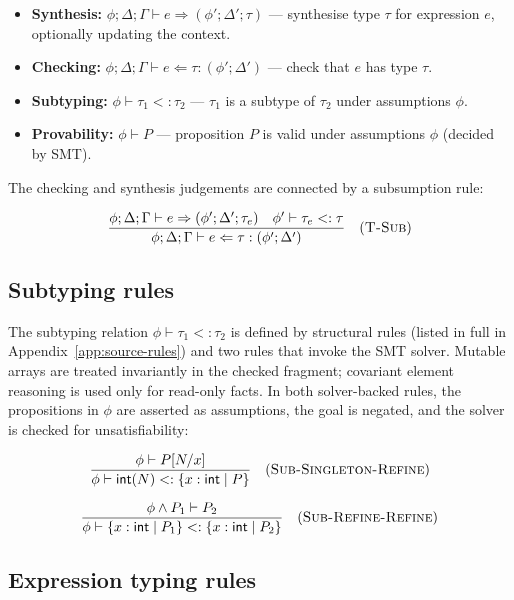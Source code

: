 \begin{itemize}
    \item \textbf{Synthesis:} $\phi; \Delta; \Gamma \vdash e \Rightarrow (\phi'; \Delta'; \tau)$ --- synthesise type $\tau$ for expression $e$, optionally updating the context.
    \item \textbf{Checking:} $\phi; \Delta; \Gamma \vdash e \Leftarrow \tau : (\phi'; \Delta')$ --- check that $e$ has type $\tau$.
    \item \textbf{Subtyping:} $\phi \vdash \tau_1 <: \tau_2$ --- $\tau_1$ is a subtype of $\tau_2$ under assumptions $\phi$.
    \item \textbf{Provability:} $\phi \vdash P$ --- proposition $P$ is valid under assumptions $\phi$ (decided by SMT).
\end{itemize}

The checking and synthesis judgements are connected by a subsumption rule:

$$\frac{\phi; \Delta; \Gamma \vdash e \Rightarrow (\phi'; \Delta'; \tau_e) \quad \phi' \vdash \tau_e <: \tau}{\phi; \Delta; \Gamma \vdash e \Leftarrow \tau : (\phi'; \Delta')} \quad (\textsc{T-Sub})$$

\subsection{Subtyping rules}

The subtyping relation $\phi \vdash \tau_1 <: \tau_2$ is defined by structural rules (listed in full in Appendix~\ref{app:source-rules}) and two rules that invoke the SMT solver. Mutable arrays are treated invariantly in the checked fragment; covariant element reasoning is used only for read-only facts. In both solver-backed rules, the propositions in $\phi$ are asserted as assumptions, the goal is negated, and the solver is checked for unsatisfiability:

$$\frac{\phi \vdash P[N/x]}{\phi \vdash \textsf{int}(N) <: \{x: \textsf{int} \mid P\}} \quad (\textsc{Sub-Singleton-Refine})$$

$$\frac{\phi \wedge P_1 \vdash P_2}{\phi \vdash \{x: \textsf{int} \mid P_1\} <: \{x: \textsf{int} \mid P_2\}} \quad (\textsc{Sub-Refine-Refine})$$

\subsection{Expression typing rules}\label{sec:expr-typing-rules}

